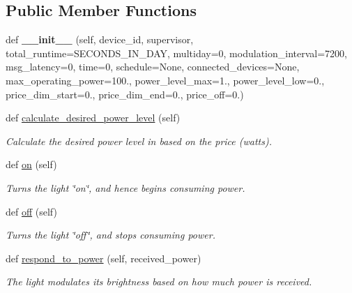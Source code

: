 \subsection*{Public Member Functions}
\begin{DoxyCompactItemize}
\item 
\mbox{\label{class_build_1_1_objects_1_1light_1_1_light_a72d9ed200ef7c129ebff92ffffe2104f}} 
def {\bfseries \+\_\+\+\_\+init\+\_\+\+\_\+} (self, device\+\_\+id, supervisor, total\+\_\+runtime=S\+E\+C\+O\+N\+D\+S\+\_\+\+I\+N\+\_\+\+D\+AY, multiday=0, modulation\+\_\+interval=7200, msg\+\_\+latency=0, time=0, schedule=None, connected\+\_\+devices=None, max\+\_\+operating\+\_\+power=100., power\+\_\+level\+\_\+max=1., power\+\_\+level\+\_\+low=0., price\+\_\+dim\+\_\+start=0., price\+\_\+dim\+\_\+end=0., price\+\_\+off=0.)
\item 
def \hyperlink{class_build_1_1_objects_1_1light_1_1_light_ab2bf34ef61021a564a4be74f618453ce}{calculate\+\_\+desired\+\_\+power\+\_\+level} (self)
\begin{DoxyCompactList}\small\item\em Calculate the desired power level in based on the price (watts). \end{DoxyCompactList}\item 
def \hyperlink{class_build_1_1_objects_1_1light_1_1_light_a12a3c2afe2f8f97aa1d5e28da9059c4e}{on} (self)
\begin{DoxyCompactList}\small\item\em Turns the light \char`\"{}on\char`\"{}, and hence begins consuming power. \end{DoxyCompactList}\item 
def \hyperlink{class_build_1_1_objects_1_1light_1_1_light_a1a7479e6107f3aa664936a234d66c689}{off} (self)
\begin{DoxyCompactList}\small\item\em Turns the light \char`\"{}off\char`\"{}, and stops consuming power. \end{DoxyCompactList}\item 
def \hyperlink{class_build_1_1_objects_1_1light_1_1_light_aabf8b9ee88178489130e5e612d22f7d0}{respond\+\_\+to\+\_\+power} (self, received\+\_\+power)
\begin{DoxyCompactList}\small\item\em The light modulates its brightness based on how much power is received. \end{DoxyCompactList}\item 

\end{DoxyCompactItemize}
